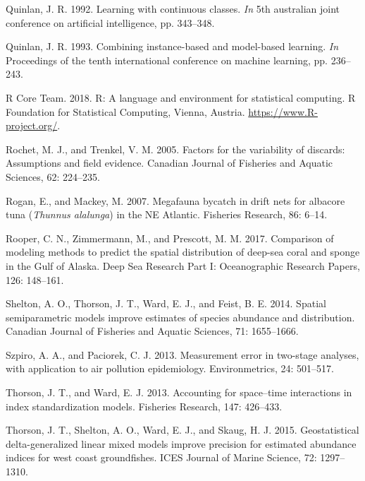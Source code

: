 \documentclass[]{article}
\begin{document}
\leavevmode\hypertarget{ref-quinlan1992}{}%
Quinlan, J. R. 1992. Learning with continuous classes. \emph{In} 5th
australian joint conference on artificial intelligence, pp. 343--348.

\leavevmode\hypertarget{ref-quinlan1993}{}%
Quinlan, J. R. 1993. Combining instance-based and model-based learning.
\emph{In} Proceedings of the tenth international conference on machine
learning, pp. 236--243.

\leavevmode\hypertarget{ref-rcoreteam2018}{}%
R Core Team. 2018. R: A language and environment for statistical
computing. R Foundation for Statistical Computing, Vienna, Austria.
\url{https://www.R-project.org/}.

\leavevmode\hypertarget{ref-rochet2005}{}%
Rochet, M. J., and Trenkel, V. M. 2005. Factors for the variability of
discards: Assumptions and field evidence. Canadian Journal of Fisheries
and Aquatic Sciences, 62: 224--235.

\leavevmode\hypertarget{ref-rogan2007}{}%
Rogan, E., and Mackey, M. 2007. Megafauna bycatch in drift nets for
albacore tuna (\emph{Thunnus alalunga}) in the NE Atlantic. Fisheries
Research, 86: 6--14.

\leavevmode\hypertarget{ref-rooper2017}{}%
Rooper, C. N., Zimmermann, M., and Prescott, M. M. 2017. Comparison of
modeling methods to predict the spatial distribution of deep-sea coral
and sponge in the Gulf of Alaska. Deep Sea Research Part I:
Oceanographic Research Papers, 126: 148--161.

\leavevmode\hypertarget{ref-shelton2014}{}%
Shelton, A. O., Thorson, J. T., Ward, E. J., and Feist, B. E. 2014.
Spatial semiparametric models improve estimates of species abundance and
distribution. Canadian Journal of Fisheries and Aquatic Sciences, 71:
1655--1666.

\leavevmode\hypertarget{ref-szpiro2013}{}%
Szpiro, A. A., and Paciorek, C. J. 2013. Measurement error in two-stage
analyses, with application to air pollution epidemiology.
Environmetrics, 24: 501--517.

\leavevmode\hypertarget{ref-thorson2013}{}%
Thorson, J. T., and Ward, E. J. 2013. Accounting for space--time
interactions in index standardization models. Fisheries Research, 147:
426--433.

\leavevmode\hypertarget{ref-thorson2015}{}%
Thorson, J. T., Shelton, A. O., Ward, E. J., and Skaug, H. J. 2015.
Geostatistical delta-generalized linear mixed models improve precision
for estimated abundance indices for west coast groundfishes. ICES
Journal of Marine Science, 72: 1297--1310.
\end{document}
